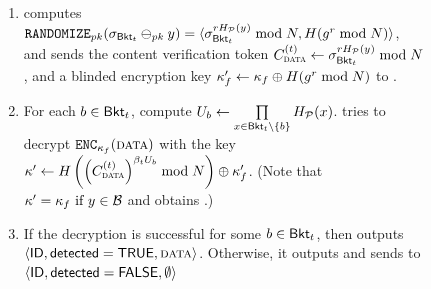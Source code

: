 \begin{figure}
{\begin{minipage}[t]{\textwidth}
\begin{enumerate}
\item \label{upload:fine_grained:token_gen} \client computes $\randomize[\pubKey](\genericSig[\bucket{\bucketIdx}] \sigMinus[\pubKey] \genericCInputElmt) = 
\langle  \genericSig[\bucket{\bucketIdx}]^{\genericRand \primeRO(\genericCInputElmt)} \bmod \rsaMod, \ro(\qrGen^{\genericRand} \bmod \rsaMod) \rangle$, and sends the content verification token $\contentToken{\clientData}^{(\bucketIdx)} \assign  \genericSig[\bucket{\bucketIdx}]^{\genericRand \primeRO(\genericCInputElmt)} \bmod \rsaMod$, and a blinded encryption key $\fileKey' \assign \fileKey \oplus \ro(\qrGen^{\genericRand} \bmod \rsaMod)$ to \server. 

\item \label{upload:verify_sig_decrypt} For each $\genericBlocklistElmt \in \bucket{\bucketIdx}$, compute $\accSet_{\genericBlocklistElmt} \assign \prod\limits_{\genericFnInput \in \bucket{\bucketIdx} \setminus \{\genericBlocklistElmt\}}\primeRO(\genericFnInput)$. \server  tries to decrypt $\encrypt[\fileKey](\clientData)$  with the key $\genericSymmKey' \assign \ro\left(\left(\contentToken{\clientData}^{(\bucketIdx)}\right)^{\blindingFactor_{\bucketIdx} \accSet_{\genericBlocklistElmt}} \bmod \rsaMod\right) \oplus \fileKey'$. (Note that $\genericSymmKey' = \fileKey ~\text{if} ~\genericCInputElmt \in 
		\blocklist$ and \server obtains \clientData.)

\item If the decryption is successful for some $\genericBlocklistElmt \in \bucket{\bucketIdx}$, then \server outputs 
$\langle \genericFileID, \detected = \tru, \clientData \rangle$. Otherwise, it outputs and sends to \client $\langle \mathsf{ID}, \mathsf{detected} = \mathsf{FALSE}, \emptyset \rangle$

\end{enumerate}






\end{minipage}}
\end{figure}
